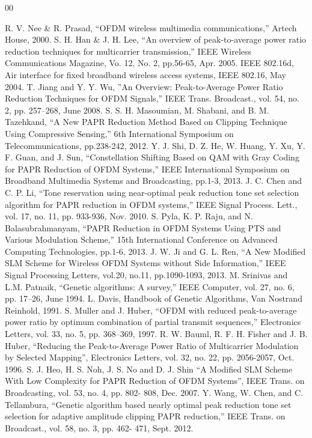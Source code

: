 \documentclass[conference]{IEEEtran}
\begin{document}
\begin{thebibliography}{00}

 R. V. Nee \& R. Prasad, “OFDM wireless multimedia communications,” Artech House, 2000.  
 S. H. Han \& J. H. Lee, “An overview of peak-to-average power ratio reduction techniques for multicarrier transmission,” IEEE Wireless Communications Magazine, Vo. 12, No. 2, pp.56-65, Apr. 2005.  
 IEEE 802.16d, Air interface for ﬁxed broadband wireless access systems, IEEE 802.16, May 2004.
 T. Jiang and Y. Y. Wu, ”An Overview: Peak-to-Average Power Ratio Reduction Techniques for OFDM Signals,” IEEE Trans. Broadcast., vol. 54, no. 2, pp. 257–268, June 2008.
 S. S. H. Masoumian, M. Shabani, and B. M. Tazehkand, “A New PAPR Reduction Method Based on Clipping Technique Using Compressive Sensing,” 6th International Symposium on Telecommunications, pp.238-242, 2012.
 Y. J. Shi, D. Z. He, W. Huang, Y. Xu, Y. F. Guan, and J. Sun, “Constellation Shifting Based on QAM with Gray Coding for PAPR Reduction of OFDM Systems,” IEEE International Symposium on Broadband Multimedia Systems and Broadcasting, pp.1-3, 2013.
 J. C. Chen and C. P. Li, “Tone reservation using near-optimal peak reduction tone set selection algorithm for PAPR reduction in OFDM systems,” IEEE Signal Process. Lett., vol. 17, no. 11, pp. 933-936, Nov. 2010.
 S. Pyla, K. P. Raju, and N. Balasubrahmanyam, “PAPR Reduction in OFDM Systems Using PTS and Various Modulation Scheme,” 15th International Conference on Advanced Computing Technologies, pp.1-6, 2013.
 J. W. Ji and G. L. Ren, “A New Modified SLM Scheme for Wireless OFDM Systems without Side Information,” IEEE Signal Processing Letters, vol.20, no.11, pp.1090-1093, 2013.
 M. Srinivas and L.M. Patnaik, “Genetic algorithms: A survey,” IEEE Computer, vol. 27, no. 6, pp. 17–26, June 1994.
 L. Davis, Handbook of Genetic Algorithms, Van Nostrand Reinhold, 1991.
 S. Muller and J. Huber, “OFDM with reduced peak-to-average power ratio by optimum combination of partial transmit sequences,” Electronics Letters, vol. 33, no. 5, pp. 368–369, 1997.
 R. W. Bauml, R. F. H. Fisher and J. B. Huber, “Reducing the Peak-to-Average Power Ratio of Multicarrier Modulation by Selected Mapping”, Electronics Letters, vol. 32, no. 22, pp. 2056-2057, Oct. 1996.
 S. J. Heo, H. S. Noh, J. S. No and D. J. Shin “A Modiﬁed SLM Scheme With Low Complexity for PAPR Reduction of OFDM Systems”, IEEE Trans. on Broadcasting, vol. 53, no. 4, pp. 802- 808, Dec. 2007.
 Y. Wang, W. Chen, and C. Tellambura, “Genetic algorithm based nearly optimal peak reduction tone set selection for adaptive amplitude clipping PAPR reduction,” IEEE Trans. on Broadcast., vol. 58, no. 3, pp. 462- 471, Sept. 2012.

\end{thebibliography}
\end{document}
